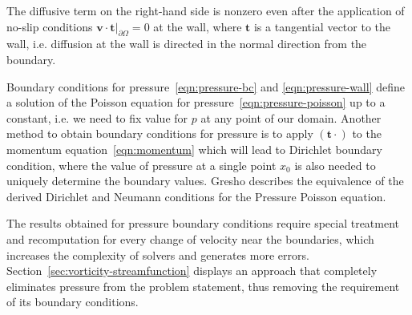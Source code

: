 \documentclass{article}
\begin{document}
The diffusive term on the right-hand side is nonzero even after the application of no-slip conditions $\boldsymbol{v}\cdot\boldsymbol{t}\bigg|_{\partial \Omega}=0$ at the wall, where $\boldsymbol{t}$ is a tangential vector to the wall, i.e. diffusion at the wall is directed in the normal direction from the boundary.


Boundary conditions for pressure~\eqref{eqn:pressure-bc} and \eqref{eqn:pressure-wall} define a solution of the Poisson equation for pressure~\eqref{eqn:pressure-poisson} up to a constant, i.e. we need to fix value for $p$ at any point of our domain. Another method to obtain boundary conditions for pressure is to apply $(\boldsymbol{t}\cdot)$ to the momentum equation~\eqref{eqn:momentum} which will lead to Dirichlet boundary condition, where the value of pressure at a single point $x_0$ is also needed to uniquely determine the boundary values. Gresho \cite{Gresho:1987} describes the equivalence of the derived Dirichlet and Neumann conditions for the Pressure Poisson equation.

The results obtained for pressure boundary conditions require special treatment and recomputation for every change of velocity near the boundaries, which increases the complexity of solvers and generates more errors. Section~\ref{sec:vorticity-streamfunction} displays an approach that completely eliminates pressure from the problem statement, thus removing the requirement of its boundary conditions. 
\end{document}
